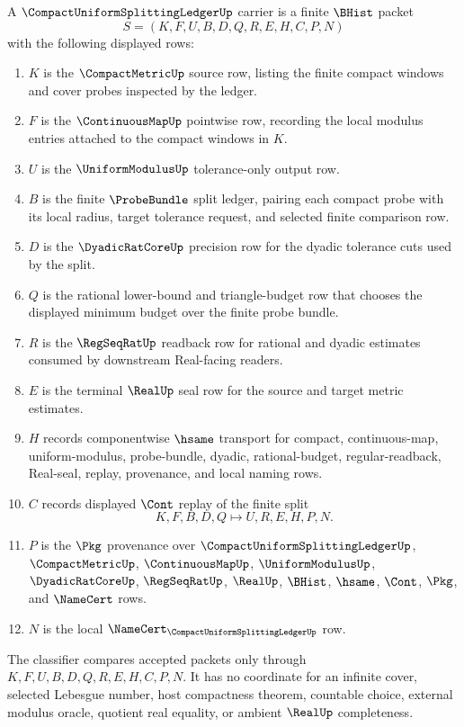 \begin{definition}
\label{def:compact-uniform-splitting-ledger-carrier}
A $\CompactUniformSplittingLedgerUp$ carrier is a finite $\BHist$ packet
$$
S=(K,F,U,B,D,Q,R,E,H,C,P,N)
$$
with the following displayed rows:
\begin{enumerate}
\item $K$ is the $\CompactMetricUp$ source row, listing the finite compact windows and cover probes inspected by the ledger.
\item $F$ is the $\ContinuousMapUp$ pointwise row, recording the local modulus entries attached to the compact windows in $K$.
\item $U$ is the $\UniformModulusUp$ tolerance-only output row.
\item $B$ is the finite $\ProbeBundle$ split ledger, pairing each compact probe with its local radius, target tolerance request, and selected finite comparison row.
\item $D$ is the $\DyadicRatCoreUp$ precision row for the dyadic tolerance cuts used by the split.
\item $Q$ is the rational lower-bound and triangle-budget row that chooses the displayed minimum budget over the finite probe bundle.
\item $R$ is the $\RegSeqRatUp$ readback row for rational and dyadic estimates consumed by downstream Real-facing readers.
\item $E$ is the terminal $\RealUp$ seal row for the source and target metric estimates.
\item $H$ records componentwise $\hsame$ transport for compact, continuous-map, uniform-modulus, probe-bundle, dyadic, rational-budget, regular-readback, Real-seal, replay, provenance, and local naming rows.
\item $C$ records displayed $\Cont$ replay of the finite split
$$
K,F,B,D,Q \longmapsto U,R,E,H,P,N .
$$
\item $P$ is the $\Pkg$ provenance over $\CompactUniformSplittingLedgerUp$, $\CompactMetricUp$, $\ContinuousMapUp$, $\UniformModulusUp$, $\DyadicRatCoreUp$, $\RegSeqRatUp$, $\RealUp$, $\BHist$, $\hsame$, $\Cont$, $\Pkg$, and $\NameCert$ rows.
\item $N$ is the local $\NameCert_{\CompactUniformSplittingLedgerUp}$ row.
\end{enumerate}
The classifier compares accepted packets only through $K,F,U,B,D,Q,R,E,H,C,P,N$. It has no coordinate for an infinite cover, selected Lebesgue number, host compactness theorem, countable choice, external modulus oracle, quotient real equality, or ambient $\RealUp$ completeness.
\end{definition}

